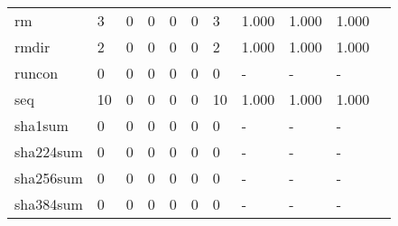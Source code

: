 \begin{longtable}{lp{1.10cm}p{1.10cm}p{1.10cm}p{1.10cm}p{1.10cm}p{1.10cm}p{1.10cm}p{1.10cm}p{1.10cm}p{1.10cm}}
rm        &                      3 &                                  0 &                                 0 &                                0 &                                 0 &                               3 &                          1.000 &                                 1.000 &                               1.000 \\
rmdir     &                      2 &                                  0 &                                 0 &                                0 &                                 0 &                               2 &                          1.000 &                                 1.000 &                               1.000 \\
runcon    &                      0 &                                  0 &                                 0 &                                0 &                                 0 &                               0 &                              - &                                     - &                                   - \\
seq       &                     10 &                                  0 &                                 0 &                                0 &                                 0 &                              10 &                          1.000 &                                 1.000 &                               1.000 \\
sha1sum   &                      0 &                                  0 &                                 0 &                                0 &                                 0 &                               0 &                              - &                                     - &                                   - \\
sha224sum &                      0 &                                  0 &                                 0 &                                0 &                                 0 &                               0 &                              - &                                     - &                                   - \\
sha256sum &                      0 &                                  0 &                                 0 &                                0 &                                 0 &                               0 &                              - &                                     - &                                   - \\
sha384sum &                      0 &                                  0 &                                 0 &                                0 &                                 0 &                               0 &                              - &                                     - &                                   - \\

\end{longtable}
